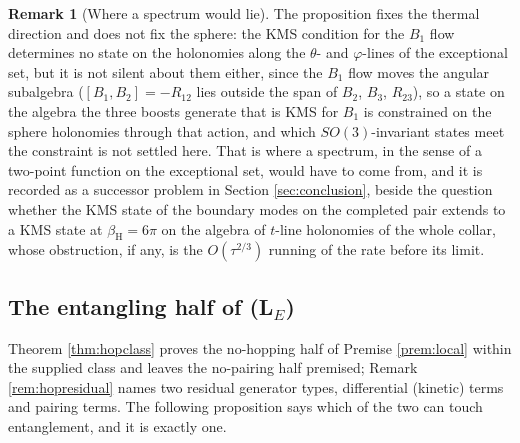\documentclass[11pt]{article}
\theoremstyle{definition}
\newtheorem{remark}[theorem]{Remark}
\begin{document}
\begin{remark}[Where a spectrum would lie]\label{rem:angular}
The proposition fixes the thermal direction and does not fix the sphere: the KMS condition for the $B_1$ flow determines no state on the holonomies along the $\theta$- and $\varphi$-lines of the exceptional set, but it is not silent about them either, since the $B_1$ flow moves the angular subalgebra ($[B_1, B_2] = -R_{12}$ lies outside the span of $B_2$, $B_3$, $R_{23}$), so a state on the algebra the three boosts generate that is KMS for $B_1$ is constrained on the sphere holonomies through that action, and which $SO(3)$-invariant states meet the constraint is not settled here. That is where a spectrum, in the sense of a two-point function on the exceptional set, would have to come from, and it is recorded as a successor problem in Section \ref{sec:conclusion}, beside the question whether the KMS state of the boundary modes on the completed pair extends to a KMS state at $\beta_{\mathrm{H}} = 6\pi$ on the algebra of $t$-line holonomies of the whole collar, whose obstruction, if any, is the $O(\tau^{2/3})$ running of the rate before its limit.
\end{remark}

\subsection{The entangling half of (L$_E$)}\label{subsec:entangling}

Theorem \ref{thm:hopclass} proves the no-hopping half of Premise \ref{prem:local} within the supplied class and leaves the no-pairing half premised; Remark \ref{rem:hopresidual} names two residual generator types, differential (kinetic) terms and pairing terms. The following proposition says which of the two can touch entanglement, and it is exactly one.
\end{document}
